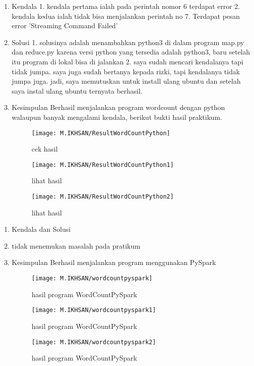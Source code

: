 \begin{enumerate}
\item Kendala  
1. kendala pertama ialah pada perintah nomor 6 terdapat error
2. kendala kedua ialah tidak bisa menjalankan perintah no 7. Terdapat pesan error 'Streaming Command Failed'

\item Solusi
1. solusinya adalah menambahkan python3 di dalam program map.py dan reduce.py karena versi python yang tersedia adalah python3, baru setelah itu program di lokal bisa di jalankan
2. saya sudah mencari kendalanya tapi tidak jumpa. saya juga sudah bertanya kepada rizki, tapi kendalanya tidak jumpa juga. jadi, saya memutuskan untuk install ulang ubuntu dan setelah saya instal ulang ubuntu ternyata berhasil.

\item Kesimpulan
Berhasil menjalankan program wordcount dengan python walaupun banyak mengalami kendala, berikut bukti hasil praktikum. 

\begin{figure}[!ht]
    \texttt{[image: M.IKHSAN/ResultWordCountPython]}
    \caption{cek hasil }
    \label{gam:hasil}
    \end{figure}
\begin{figure}[!ht]
    \texttt{[image: M.IKHSAN/ResultWordCountPython1]}
    \caption{lihat hasil}
    \label{gam:hasil}
    \end{figure}
\begin{figure}[!ht]
    \texttt{[image: M.IKHSAN/ResultWordCountPython2]}
    \caption{lihat hasil}
    \label{gam:hasil}
    \end{figure}
\end{enumerate}

\begin{enumerate}
\item Kendala dan Solusi
\item tidak menemukan masalah pada pratikum

\item Kesimpulan
Berhasil menjalankan program menggunakan PySpark

\begin{figure}[!ht]
    \texttt{[image: M.IKHSAN/wordcountpyspark]}
    \caption{hasil program WordCountPySpark }
    \label{gam:hasil instalasi spark}
    \end{figure}
\begin{figure}[!ht]
    \texttt{[image: M.IKHSAN/wordcountpyspark1]}
    \caption{hasil program WordCountPySpark }
    \label{gam:hasil instalasi spark}
    \end{figure}
\begin{figure}[!ht]
    \texttt{[image: M.IKHSAN/wordcountpyspark2]}
    \caption{hasil program WordCountPySpark }
    \label{gam:hasil instalasi spark}
    \end{figure}
\end{enumerate}